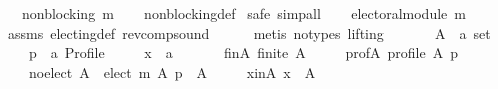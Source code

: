 \begin{isabellebody}
\ \ \ {\isachardoublequoteopen}non{\isacharunderscore}{\kern0pt}blocking\ {\isacharparenleft}{\kern0pt}m{\isasymdown}{\isacharparenright}{\kern0pt}{\isachardoublequoteclose}\isanewline
%
\isadelimproof
\ \ %
\endisadelimproof
%
\isatagproof
{}\isamarkupfalse%
\ non{\isacharunderscore}{\kern0pt}blocking{\isacharunderscore}{\kern0pt}def\isanewline
{}\isamarkupfalse%
\ {\isacharparenleft}{\kern0pt}safe{\isacharcomma}{\kern0pt}\ simp{\isacharunderscore}{\kern0pt}all{\isacharparenright}{\kern0pt}\isanewline
\ \ \isamarkupfalse%
\ {\isachardoublequoteopen}electoral{\isacharunderscore}{\kern0pt}module\ {\isacharparenleft}{\kern0pt}m{\isasymdown}{\isacharparenright}{\kern0pt}{\isachardoublequoteclose}\isanewline
\ \ \ \ \isamarkupfalse%
\ assms\ electing{\isacharunderscore}{\kern0pt}def\ rev{\isacharunderscore}{\kern0pt}comp{\isacharunderscore}{\kern0pt}sound\isanewline
\ \ \ \ \isamarkupfalse%
\ {\isacharparenleft}{\kern0pt}metis\ {\isacharparenleft}{\kern0pt}no{\isacharunderscore}{\kern0pt}types{\isacharcomma}{\kern0pt}\ lifting{\isacharparenright}{\kern0pt}{\isacharparenright}{\kern0pt}\isanewline
{}\isamarkupfalse%
\isanewline
\ \ \isamarkupfalse%
\isanewline
\ \ \ \ A\ {\isacharcolon}{\kern0pt}{\isacharcolon}{\kern0pt}\ {\isachardoublequoteopen}{\isacharprime}{\kern0pt}a\ set{\isachardoublequoteclose}\ \isanewline
\ \ \ \ p\ {\isacharcolon}{\kern0pt}{\isacharcolon}{\kern0pt}\ {\isachardoublequoteopen}{\isacharprime}{\kern0pt}a\ Profile{\isachardoublequoteclose}\ \isanewline
\ \ \ \ x\ {\isacharcolon}{\kern0pt}{\isacharcolon}{\kern0pt}\ {\isachardoublequoteopen}{\isacharprime}{\kern0pt}a{\isachardoublequoteclose}\isanewline
\ \ \isamarkupfalse%
\isanewline
\ \ \ \ fin{\isacharunderscore}{\kern0pt}A{\isacharcolon}{\kern0pt}\ {\isachardoublequoteopen}finite\ A{\isachardoublequoteclose}\ \isanewline
\ \ \ \ prof{\isacharunderscore}{\kern0pt}A{\isacharcolon}{\kern0pt}\ {\isachardoublequoteopen}profile\ A\ p{\isachardoublequoteclose}\ \isanewline
\ \ \ \ no{\isacharunderscore}{\kern0pt}elect{\isacharcolon}{\kern0pt}\ {\isachardoublequoteopen}A\ {\isacharminus}{\kern0pt}\ elect\ m\ A\ p\ {\isacharequal}{\kern0pt}\ A{\isachardoublequoteclose}\ \isanewline
\ \ \ \ x{\isacharunderscore}{\kern0pt}in{\isacharunderscore}{\kern0pt}A{\isacharcolon}{\kern0pt}\ {\isachardoublequoteopen}x\ {\isasymin}\ A{\isachardoublequoteclose}\isanewline
\ \ \isamarkupfalse%

\end{isabellebody}
